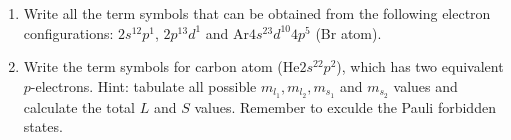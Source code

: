 \begin{enumerate}
\begin{enumerate}
\item Write all the term symbols that can be obtained from the following electron configurations: $2s^12p^1$, $2p^13d^1$ and Ar$4s^23d^{10}4p^5$ (Br atom).
\item Write the term symbols for carbon atom (He$2s^22p^2$), which has two equivalent $p$-electrons. Hint: tabulate all possible $m_{l_1}, m_{l_2}, m_{s_1}$ and $m_{s_2}$ values and calculate the total $L$ and $S$ values. Remember to exculde the Pauli forbidden states.
\end{enumerate}


\end{enumerate}
